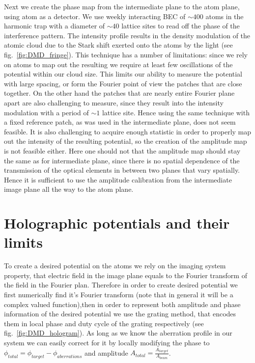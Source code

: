 Next we create the phase map from the intermediate plane to the atom plane, using atom as a detector. We use weekly interacting BEC of $\sim 400$ atoms in the harmonic trap with a diameter of $\sim 40$ lattice sites to read off the phase of the interference pattern. The intensity profile results in the density modulation of the atomic cloud due to the Stark shift exerted onto the atoms by the light (see fig.~\ref{fig:DMD_fringe}). This technique has a number of limitations: since we rely on atoms to map out the resulting we require at least few oscillations of the potential within our cloud size. This limits our ability to measure the potential with large spacing, or form the Fourier point of view the patches that are close together. On the other hand the patches that are nearly entire Fourier plane apart are also challenging to measure, since they result into the intensity modulation with a period of $\sim 1$ lattice site. Hence using the same technique with a fixed reference patch, as was used in the intermediate plane, does not seem feasible. It is also challenging to acquire enough statistic in order to properly map out the intensity of the resulting potential, so the creation of the amplitude map is not feasible either. Here one should not that the amplitude map should stay the same as for intermediate plane, since there is no spatial dependence of the transmission of the optical elements in between two planes that vary spatially. Hence it is sufficient to use the amplitude calibration from the intermediate image plane all the way to the atom plane.

\section{Holographic potentials and their limits}
To create a desired potential on the atoms we rely on the imaging system property, that electric field in the image plane equals to the Fourier transform of the field in the Fourier plan. Therefore in order to create desired potential we first numerically find it's Fourier transform (note that in general it will be a complex valued function),then in order to represent both amplitude and phase information of the desired potential we use the grating method, that encodes them in local phase and duty cycle of the grating respectively (see fig.~\ref{fig:DMD_hologram}). As long as we know the aberration profile in our system we can easily correct for it by locally modifying the phase to $\phi_{total} = \phi_{target} - \phi_{aberrations}$ and amplitude $A_{total} = \frac{A_{target}}{A_{beam}}$.

